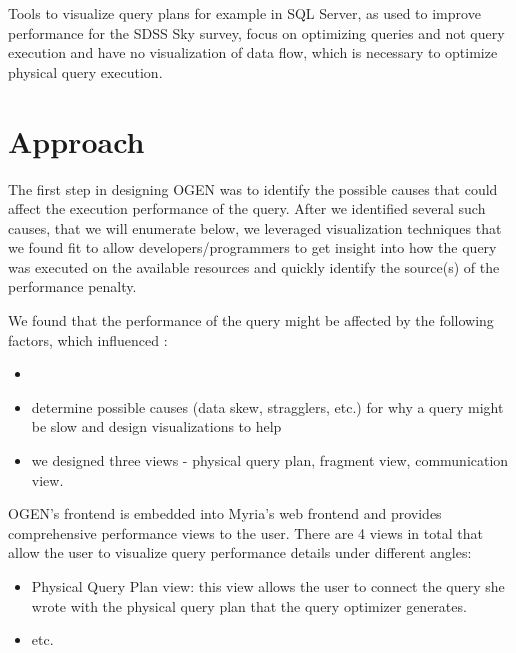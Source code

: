 \documentclass{chi2009}
\newcommand*{\system}{OGEN\xspace}
\begin{document}
Tools to visualize query plans for example in SQL Server, as used to improve performance for the SDSS Sky survey\cite{szalay2002sdss}, focus on optimizing queries and not query execution and have no visualization of data flow, which is necessary to optimize physical query execution.

\section{Approach}
\label{sec:approach}


The first step in designing \system was to identify the possible causes that
could affect the execution performance of the query. After we identified
several such causes, that we will enumerate below, we leveraged visualization
techniques that we found fit to allow developers/programmers to get insight
into how the query was executed on the available resources and quickly
identify the source(s) of the performance penalty.

We found that the performance of the query might be affected by the following
factors, which influenced :
\begin{itemize}
   \item 
\end{itemize} 


\begin{itemize}
    \item determine possible causes (data skew, stragglers, etc.) for why a query might be slow and design visualizations to
help
    \item we designed three views - physical query plan, fragment view, communication view.
\end{itemize}


\system's frontend is embedded into Myria's web frontend and provides comprehensive performance views to the user. There are 4 views in total that allow the user to visualize query performance details under different angles:
\begin{itemize}
    \item Physical Query Plan view: this view allows the user to connect the query she wrote with the physical query plan that the query optimizer generates.
    \item etc. 
\end{itemize}
\end{document}

